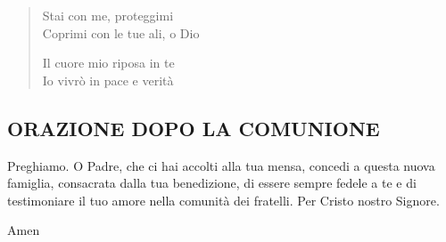 \begin{verse}
\begin{mystrofe}
Stai con me, proteggimi \\
Coprimi con le tue ali, o Dio \\
\end{mystrofe}


\begin{mystrofe}
Il cuore mio riposa in te \\
Io vivrò in pace e verità \\
\end{mystrofe}

\end{verse}

\subsection*{ORAZIONE DOPO LA COMUNIONE}

\begin{dialoghi}
\item[\sacerdote] Preghiamo. O Padre, che ci hai accolti alla tua mensa, concedi a questa nuova famiglia, consacrata dalla tua benedizione, di essere sempre fedele a te e di testimoniare il tuo amore nella comunità dei fratelli. Per Cristo nostro Signore.
\item[\assemblea] Amen
\end{dialoghi}
